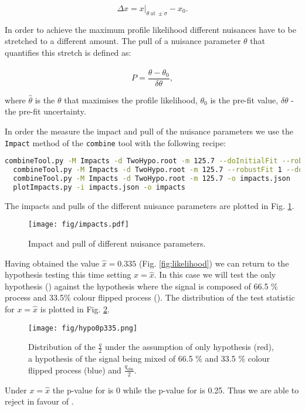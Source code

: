 \begin{equation}
  \Delta x = x\bigg\rvert_{\theta\ \text{at}\ \pm\sigma}-x_{0}.
\end{equation} 

In order to achieve the maximum profile likelihood different nuisances have to be stretched to a different amount. The pull of a nuisance parameter $\theta$ that quantifies this stretch is defined as:

\begin{equation}
  P = \frac{\hat{\theta}-\theta_{0}}{\delta\theta},
\end{equation} 

where $\hat{\theta}$ is the $\theta$ that maximises the profile likelihood, $\theta_{0}$ is the pre-fit value, $\delta\theta$ - the pre-fit uncertainty.

In order the measure the impact and pull of the nuisance parameters we use the \lstinline[language=sh]|Impact| method of the \lstinline[language=sh]|combine| tool with the following recipe:

\begin{lstlisting}[language=sh]
  combineTool.py -M Impacts -d TwoHypo.root -m 125.7 --doInitialFit --robustFit 1
  combineTool.py -M Impacts -d TwoHypo.root -m 125.7 --robustFit 1 --doFits
  combineTool.py -M Impacts -d TwoHypo.root -m 125.7 -o impacts.json
  plotImpacts.py -i impacts.json -o impacts
\end{lstlisting}

The impacts and pulls of the different nuisance parameters are plotted in Fig. \ref{fig:impacts}.

\begin{figure}
  \centering
  \texttt{[image: fig/impacts.pdf]}
  \caption{Impact and pull of different nuisance parameters.}
  \label{fig:impacts}
\end{figure}

Having obtained the value $\hat{x}=0.335$ (Fig. \ref{fig:likelihood}) we can return to the hypothesis testing this time setting $x=\hat{x}$. In this case we will test the \ttbar only hypothesis (\Hnull) against the hypothesis where the signal is composed of 66.5 \% \ttbar process and 33.5\% colour flipped \ttbar process (\Halt). The distribution of the test statistic for $x=\hat{x}$ is plotted in Fig. \ref{fig:hypo0p335}.

\begin{figure}
  \centering
  \texttt{[image: fig/hypo0p335.png]}
  \caption{Distribution of the $\frac{q}{2}$ under the assumption of \ttbar only hypothesis (red), a hypothesis of the signal being mixed of 66.5 \% \ttbar and 33.5 \% colour flipped \ttbar process (blue) and $\frac{q_{\text{obs}}}{2}$.}
  \label{fig:hypo0p335}
\end{figure}

Under $x=\hat{x}$ the p-value for \Hnull is 0 while the p-value for \Halt is 0.25. Thus we are able to reject \Hnull in favour of \Halt.

